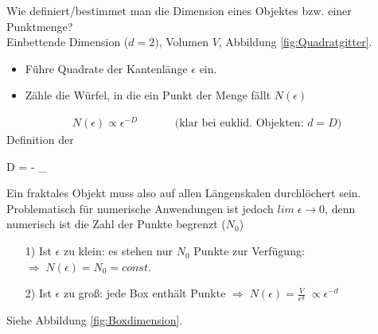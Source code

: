 \documentclass[12pt]{article}
\begin{document}
Wie definiert/bestimmet man die Dimension eines Objektes bzw. einer Punktmenge? \\ 
Einbettende Dimension ($d=2)$, Volumen $V$, Abbildung \ref{fig:Quadratgitter}. 
\begin{itemize}
\item Führe Quadrate der Kantenlänge $\epsilon$ ein.
\item Zähle die Würfel, in die ein Punkt der Menge fällt $N(\epsilon)$
\end{itemize}
\begin{align*}
N(\epsilon) \propto \epsilon ^{-D} \qquad \quad \text{ (klar bei euklid. Objekten: }d=D)
\end{align*}
Definition der
\begin{tcolorbox}[ams gather,title= Hausdorff-Dimension, colback=blue!10!white, colframe=blue!30!black] 
D = - \lim_{\epsilon {}} 
\end{tcolorbox} Ein fraktales Objekt muss also auf allen Längenskalen durchlöchert sein. Problematisch für numerische Anwendungen ist jedoch $lim \; \epsilon \to 0$, denn numerisch ist die Zahl der Punkte begrenzt ($N_0$)
\begin{enumerate}
\item[1)] Ist $\epsilon$ zu klein: es stehen nur $N_0$ Punkte zur Verfügung: $\Rightarrow \; N(\epsilon) = N_0 = const.$
\item[2)] Ist $\epsilon$ zu groß: jede Box enthält Punkte $\Rightarrow \; N(\epsilon) = \frac{V}{\epsilon^d} \; \propto \epsilon^{-d}$
\end{enumerate}
Siehe Abbildung \ref{fig:Boxdimension}. \\
\end{document}

